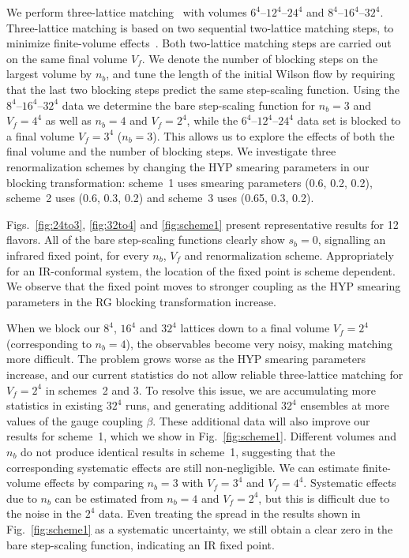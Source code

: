 \documentclass{PoS}
\newcommand{\be}{\ensuremath{\beta} }
\newcommand{\fig}[1]{Fig.~\ref{#1}}
\begin{document}
We perform three-lattice matching~\cite{Hasenfratz:2011xn} with volumes $6^4$--$12^4$--$24^4$ and $8^4$--$16^4$--$32^4$.
Three-lattice matching is based on two sequential two-lattice matching steps, to minimize finite-volume effects~\cite{Hasenfratz:2011xn}.
Both two-lattice matching steps are carried out on the same final volume $V_f$.
We denote the number of blocking steps on the largest volume by $n_b$, and tune the length of the initial Wilson flow by requiring that the last two blocking steps predict the same step-scaling function.
Using the $8^4$--$16^4$--$32^4$ data we determine the bare step-scaling function for $n_b = 3$ and $V_f = 4^4$ as well as $n_b = 4$ and $V_f = 2^4$, while the $6^4$--$12^4$--$24^4$ data set is blocked to a final volume $V_f = 3^4$ ($n_b = 3$).
This allows us to explore the effects of both the final volume and the number of blocking steps.
We investigate three renormalization schemes by changing the HYP smearing parameters in our blocking transformation: scheme~1 uses smearing parameters (0.6, 0.2, 0.2), scheme~2 uses (0.6, 0.3, 0.2) and scheme~3 uses (0.65, 0.3, 0.2).

Figs.~\ref{fig:24to3}, \ref{fig:32to4} and \ref{fig:scheme1} present representative results for 12 flavors.
All of the bare step-scaling functions clearly show $s_b = 0$, signalling an infrared fixed point, for every $n_b$, $V_f$ and renormalization scheme.
Appropriately for an IR-conformal system, the location of the fixed point is scheme dependent.
We observe that the fixed point moves to stronger coupling as the HYP smearing parameters in the RG blocking transformation increase.

When we block our $8^4$, $16^4$ and $32^4$ lattices down to a final volume $V_f = 2^4$ (corresponding to $n_b = 4$), the observables become very noisy, making matching more difficult.
The problem grows worse as the HYP smearing parameters increase, and our current statistics do not allow reliable three-lattice matching for $V_f = 2^4$ in schemes~2 and 3.
To resolve this issue, we are accumulating more statistics in existing $32^4$ runs, and generating additional $32^4$ ensembles at more values of the gauge coupling $\be$.
These additional data will also improve our results for scheme~1, which we show in \fig{fig:scheme1}.
Different volumes and $n_b$ do not produce identical results in scheme~1, suggesting that the corresponding systematic effects are still non-negligible.
We can estimate finite-volume effects by comparing $n_b = 3$ with $V_f = 3^4$ and $V_f = 4^4$.
Systematic effects due to $n_b$ can be estimated from $n_b = 4$ and $V_f = 2^4$, but this is difficult due to the noise in the $2^4$ data.
Even treating the spread in the results shown in \fig{fig:scheme1} as a systematic uncertainty, we still obtain a clear zero in the bare step-scaling function, indicating an IR fixed point.
\end{document}
